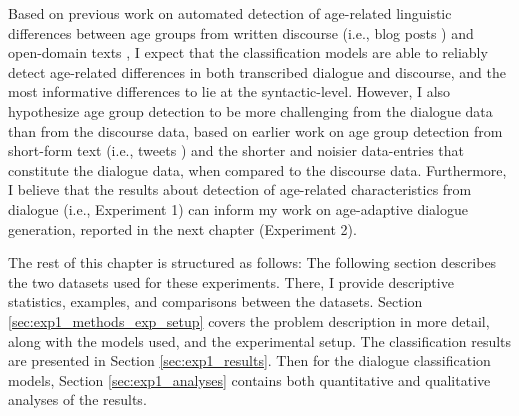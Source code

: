 Based on previous work on automated detection of age-related linguistic differences between age groups from written discourse (i.e., blog posts \citep{schler2006effects}) and open-domain texts \citep{abdallah2020age}, I expect that the classification models are able to reliably detect age-related differences in both transcribed dialogue and discourse, and the most informative differences to lie at the syntactic-level. However, I also hypothesize age group detection to be more challenging from the dialogue data than from the discourse data, based on earlier work on age group detection from short-form text (i.e., tweets \citep{nguyen2014gender}) and the shorter and noisier data-entries that constitute the dialogue data, when compared to the discourse data. Furthermore, I believe that the results about detection of age-related characteristics from dialogue (i.e., Experiment 1) can inform my work on age-adaptive dialogue generation, reported in the next chapter (Experiment 2).


The rest of this chapter is structured as follows: The following section describes the two datasets used for these experiments. There, I provide descriptive statistics, examples, and comparisons between the datasets. Section \ref{sec:exp1_methods_exp_setup} covers the problem description in more detail, along with the models used, and the experimental setup. The classification results are presented in Section \ref{sec:exp1_results}. Then for the dialogue classification models, Section \ref{sec:exp1_analyses} contains both quantitative and qualitative analyses of the results.

